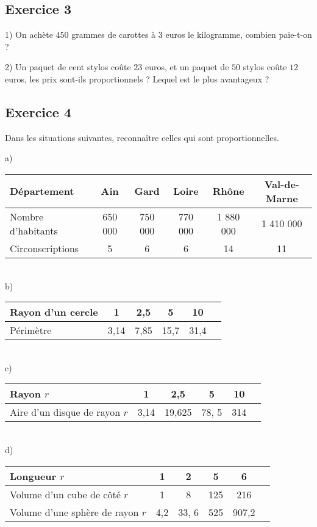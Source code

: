 \documentclass[12 pt]{extarticle}
\theoremstyle{plain}
\begin{document}
\subsection*{Exercice 3}

1) On achète $450$ grammes de carottes à $3$ euros le kilogramme, combien paie-t-on ? 

2) Un paquet de cent stylos coûte $23$ euros, et un paquet de $50$ 
stylos coûte $12$ euros, les prix sont-ils proportionnels ? Lequel est le plus avantageux ?

\subsection*{Exercice 4}

Dans les situations suivantes, reconnaître celles qui sont proportionnelles. 

a) \begin{tabular}{|l | c |c | c| c|c| }\hline
Département & Ain & Gard & Loire & Rhône & Val-de-Marne\\
\hline
Nombre d'habitants & 650 000 & 750 000  & 770 000 & 1 880 000 &1 410 000 \\
Circonscriptions & 5 & 6 & 6 & 14 & 11 \\ \hline
\end{tabular} 

 \ \\ 
 
b) \begin{tabular}{|l | c | c | c | c | c}
\hline
Rayon d'un cercle & 1 & 2,5 &  5 & 10 \\
\hline
Périmètre & 3,14 &7,85 & 15,7& 31,4\\ \hline

\end{tabular}

 \ \\ 
 
 
c) \begin{tabular}{|l | c | c | c | c | c}
\hline
Rayon $r$ & 1 & 2,5 &  5 & 10 \\
\hline
Aire d'un disque de rayon $r$ & 3,14 & 19,625 & 78, 5& 314\\ \hline

\end{tabular}

 \ \\ 
 
d) \begin{tabular}{|l | c | c | c | c | c}
\hline
Longueur $r$ & 1 & 2 &  5 & 6 \\
\hline
Volume d'un cube de côté $r$ & 1 & 8 & 125 & 216 \\ \hline
Volume d'une sphère de rayon $r$ & 4,2 & 33, 6 & 525& 907,2\\ \hline

\end{tabular}
 
\end{document}
